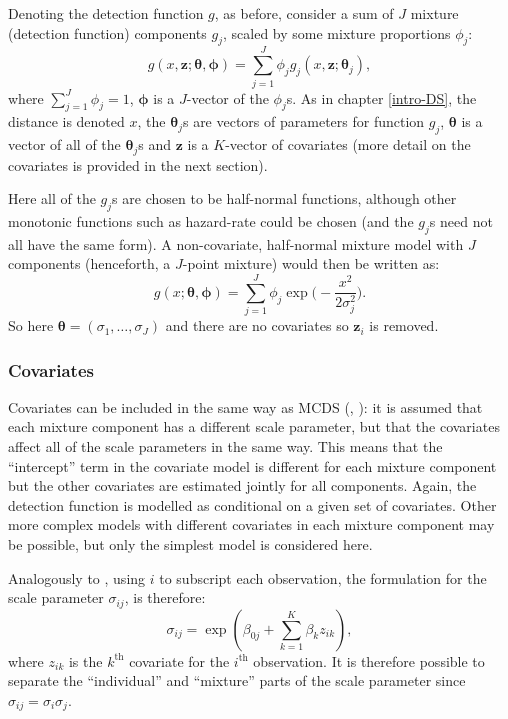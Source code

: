 \label{cor-8s3}Denoting the detection function $g$, as before, consider a sum of $J$ mixture (detection function) components $g_j$, scaled by some mixture proportions $\phi_j$:
\begin{equation}
g(x,\mathbf{z}; \bm{\theta}, \bm{\phi}) = \sum_{j=1}^J \phi_j g_j(x,\mathbf{z}; \bm{\theta}_j),
\label{mix-detfct}
\end{equation}
where $\sum_{j=1}^J \phi_j = 1$, $\bm{\phi}$ is a $J$-vector of the $\phi_j$s. As in chapter \ref{intro-DS}, the distance is denoted $x$, the $\bm{\theta}_j$s are vectors of parameters for function $g_j$, $\bm{\theta}$ is a vector of all of the $\bm{\theta}_j$s and $\mathbf{z}$ is a $K$-vector of covariates (more detail on the covariates is provided in the next section).

Here all of the $g_j$s are chosen to be half-normal functions, although other monotonic functions such as hazard-rate could be chosen (and the $g_j$s need not all have the same form). A non-covariate, half-normal mixture model with $J$ components (henceforth, a $J$-point mixture\label{cor-e10}) would then be written as:
\begin{equation*}
g(x; \bm{\theta}, \bm{\phi}) = \sum_{j=1}^J \phi_j \exp \Big( - \frac{x^2}{2\sigma_j^2} \Big).
\end{equation*}
So here $\bm{\theta} = (\sigma_1, \ldots, \sigma_J)$ and there are no covariates so $\mathbf{z}_i$ is removed.

\subsubsection{Covariates}

Covariates can be included in the same way as MCDS (, \cite[Chapter 3]{ADS}): it is assumed that each mixture component has a different scale parameter, but that the covariates affect all of the scale parameters in the same way. This means that the ``intercept'' term in the covariate model is different for each mixture component but the other covariates are estimated jointly for all components. Again, the detection function is modelled as conditional on a given set of covariates\label{cor-8s3-3}. Other more complex models with different covariates in each mixture component may be possible, but only the simplest model is considered here.

Analogously to , using $i$ to subscript each observation, the formulation for the scale parameter $\sigma_{ij}$, is therefore:
\begin{equation*}
\sigma_{ij} = \exp( \beta_{0j} + \sum_{k=1}^K \beta_k z_{ik}),
\end{equation*}
where $z_{ik}$ is the $k^\text{th}$ covariate for the $i^\text{th}$ observation. It is therefore possible to separate the ``individual'' and ``mixture'' parts of the scale parameter since $\sigma_{ij}=\sigma_i\sigma_j$.\label{cor-8s4}

